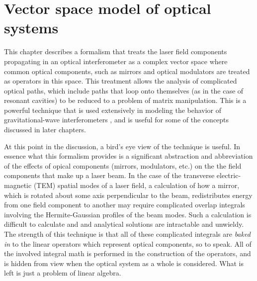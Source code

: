 \chapter{Vector space model of optical systems}
\label{ch:modalmodel}
This chapter describes a formalism that treats the laser field components propagating in an optical interferometer as a complex vector space where common optical components, such as mirrors and optical modulators are treated as operators in this space. %
This treatment allows the analysis of complicated optical paths, which include paths that loop onto themselves (as in the case of resonant cavities) to be reduced to a problem of matrix manipulation. %
This is a powerful technique that is used extensively in modeling the behavior of gravitational-wave interferometers \cite{Vinet1986,Hefetz:97,Sigg:00}, and is useful for some of the concepts discussed in later chapters.

At this point in the discussion, a bird's eye view of the technique is useful. %
In essence what this formalism provides is a significant abstraction and abbreviation of the effects of opical components (mirrors, modulators, etc.) on the the field components that make up a laser beam. %
In the case of the transverse electric-magnetic (TEM) spatial modes of a laser field, a calculation of how a mirror, which is rotated about some axis perpendicular to the beam, redistributes energy from one field component to another may require complicated overlap integrals involving the Hermite-Gaussian profiles of the beam modes. %
Such a calculation is difficult to calculate and and analytical solutions are intractable and unwieldy. %
The strength of this technique is that all of these complicated integrals are \emph{baked in} to the linear operators which represent optical components, so to speak. %
All of the involved integral math is performed in the construction of the operators, and is hidden from view when the optical system as a whole is considered. %
What is left is just a problem of linear algebra.

